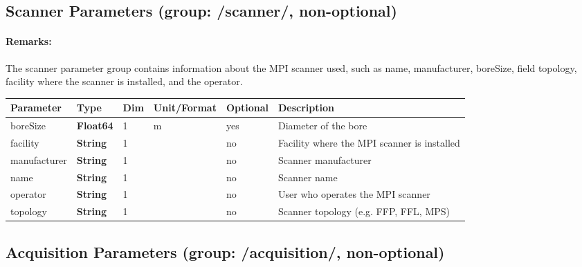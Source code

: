 \documentclass[landscape,a4paper]{article} %
\newcommand{\inltab}[1]{{\ttfamily\bfseries\color{blue}#1}}
\newcommand{\inlvar}[1]{{\ttfamily#1}}
\begin{document}
\newpage
\subsection{Scanner Parameters (group: \inlvar{/scanner/}, non-optional)}

\begin{multicols}{2}
\paragraph{Remarks:} The scanner parameter group contains information about the MPI scanner used, such as \inlvar{name}, \inlvar{manufacturer}, \inlvar{boreSize}, field \inlvar{topology}, \inlvar{facility} where the scanner is installed, and the \inlvar{operator}.
\end{multicols}

\noindent \begin{tabularx}{\columnwidth}{lllllX}
\noindent \textbf{Parameter} & \textbf{Type} & \textbf{Dim} & \textbf{Unit/Format} & \textbf{Optional} & \textbf{Description} \\ \hline 
\inlvar{boreSize} & \inltab{Float64} & 1 & m & yes & Diameter of the bore \\ \hline 
\inlvar{facility} & \inltab{String} & 1 & & no & Facility where the MPI scanner is installed \\ \hline 
\inlvar{manufacturer} & \inltab{String} & 1 & & no & Scanner manufacturer \\ \hline 
\inlvar{name} & \inltab{String} & 1 & & no & Scanner name \\ \hline 
\inlvar{operator} & \inltab{String} & 1 & & no & User who operates the MPI scanner \\ \hline 
\inlvar{topology} & \inltab{String} & 1 & & no & Scanner topology (e.g. FFP, FFL, MPS)\\ \hline 
\end{tabularx}

\newpage
\subsection{Acquisition Parameters (group: \inlvar{/acquisition/}, non-optional)}
\end{document}
